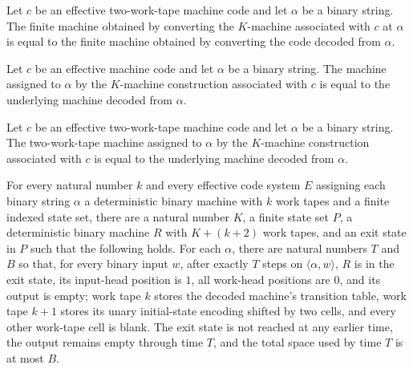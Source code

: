 \begin{theorem}
\label{Turing.EffectiveMachineCode2.toK_toFinTM}
\leanok
{}
Let $c$ be an effective two-work-tape machine code and let $\alpha$ be a binary string.
The finite machine obtained by converting the $K$-machine associated with $c$ at
$\alpha$ is equal to the finite machine obtained by converting the code decoded from
$\alpha$.
\end{theorem}

\begin{theorem}
\label{Turing.EffectiveMachineCode.toK_machine}
\leanok
{}
Let $c$ be an effective machine code and let $\alpha$ be a binary string. The machine
assigned to $\alpha$ by the $K$-machine construction associated with $c$ is equal to the
underlying machine decoded from $\alpha$.
\end{theorem}

\begin{theorem}
\label{Turing.EffectiveMachineCode2.toK_machine}
\leanok
{}
Let $c$ be an effective two-work-tape machine code and let $\alpha$ be a binary string.
The two-work-tape machine assigned to $\alpha$ by the $K$-machine construction
associated with $c$ is equal to the underlying machine decoded from $\alpha$.
\end{theorem}

\begin{theorem}
\label{Turing.exists_selfStartupTMK}
\leanok
{}
For every natural number $k$ and every effective code system $E$ assigning each binary
string $\alpha$ a deterministic binary machine with $k$ work tapes and a finite indexed
state set, there are a natural number $K$, a finite state set $P$, a deterministic
binary machine $R$ with $K+(k+2)$ work tapes, and an exit state in $P$ such that the
following holds. For each $\alpha$, there are natural numbers $T$ and $B$ so that, for
every binary input $w$, after exactly $T$ steps on $\langle\alpha,w\rangle$, $R$ is in
the exit state, its input-head position is $1$, all work-head positions are $0$, and its
output is empty; work tape $k$ stores the decoded machine's transition table, work tape
$k+1$ stores its unary initial-state encoding shifted by two cells, and every other
work-tape cell is blank. The exit state is not reached at any earlier time, the output
remains empty through time $T$, and the total space used by time $T$ is at most $B$.
\end{theorem}

